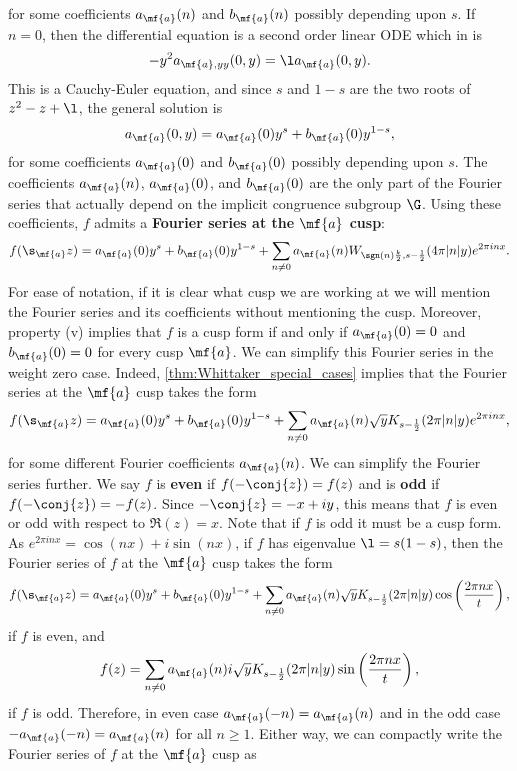    for some coefficients $a_{\mf{a}}(n)$ and $b_{\mf{a}}(n)$ possibly depending upon $s$. If $n = 0$, then the differential equation is a second order linear ODE which in is
    \[
      -y^{2}a_{\mf{a},yy}(0,y) = \l a_{\mf{a}}(0,y).
    \]
    This is a Cauchy-Euler equation, and since $s$ and $1-s$ are the two roots of $z^{2}-z+\l$, the general solution is
    \[
      a_{\mf{a}}(0,y) = a_{\mf{a}}(0)y^{s}+b_{\mf{a}}(0)y^{1-s},
    \]
    for some coefficients $a_{\mf{a}}(0)$ and $b_{\mf{a}}(0)$ possibly depending upon $s$. The coefficients $a_{\mf{a}}(n)$, $a_{\mf{a}}(0)$, and $b_{\mf{a}}(0)$ are the only part of the Fourier series that actually depend on the implicit congruence subgroup $\G$. Using these coefficients, $f$ admits a \textbf{Fourier series at the $\mf{a}$ cusp}:
    \[
      f(\s_{\mf{a}}z) = a_{\mf{a}}(0)y^{s}+b_{\mf{a}}(0)y^{1-s}+\sum_{n \neq 0}a_{\mf{a}}(n)W_{\sgn(n)\frac{k}{2},s-\frac{1}{2}}(4\pi|n|y)e^{2\pi inx}.
    \]
    For ease of notation, if it is clear what cusp we are working at we will mention the Fourier series and its coefficients without mentioning the cusp. Moreover, property (v) implies that $f$ is a cusp form if and only if $a_{\mf{a}}(0) = 0$ and $b_{\mf{a}}(0) = 0$ for every cusp $\mf{a}$. We can simplify this Fourier series in the weight zero case. Indeed, \cref{thm:Whittaker_special_cases} implies that the Fourier series at the $\mf{a}$ cusp takes the form
    \[
      f(\s_{\mf{a}}z) = a_{\mf{a}}(0)y^{s}+b_{\mf{a}}(0)y^{1-s}+\sum_{n \neq 0}a_{\mf{a}}(n)\sqrt{y}K_{s-\frac{1}{2}}(2\pi|n|y)e^{2\pi inx},
    \]
    for some different Fourier coefficients $a_{\mf{a}}(n)$. We can simplify the Fourier series further. We say $f$ is \textbf{even} if $f(-\conj{z}) = f(z)$ and is \textbf{odd} if $f(-\conj{z}) = -f(z)$. Since $-\conj{z} = -x+iy$, this means that $f$ is even or odd with respect to $\Re(z) = x$. Note that if $f$ is odd it must be a cusp form. As $e^{2\pi inx} = \cos(nx)+i\sin(nx)$, if $f$ has eigenvalue $\l = s(1-s)$, then the Fourier series of $f$ at the $\mf{a}$ cusp takes the form 
    \[
      f(\s_{\mf{a}}z) = a_{\mf{a}}(0)y^{s}+b_{\mf{a}}(0)y^{1-s}+\sum_{n \neq 0}a_{\mf{a}}(n)\sqrt{y}K_{s-\frac{1}{2}}(2\pi|n|y)\cos\left(\frac{2\pi nx}{t}\right),
    \]
    if $f$ is even, and
    \[
      f(z) = \sum_{n \neq 0}a_{\mf{a}}(n)i\sqrt{y}K_{s-\frac{1}{2}}(2\pi|n|y)\sin\left(\frac{2\pi nx}{t}\right),
    \]
    if $f$ is odd. Therefore, in even case $a_{\mf{a}}(-n) = a_{\mf{a}}(n)$ and in the odd case $-a_{\mf{a}}(-n) = a_{\mf{a}}(n)$ for all $n \ge 1$. Either way, we can compactly write the Fourier series of $f$ at the $\mf{a}$ cusp as
